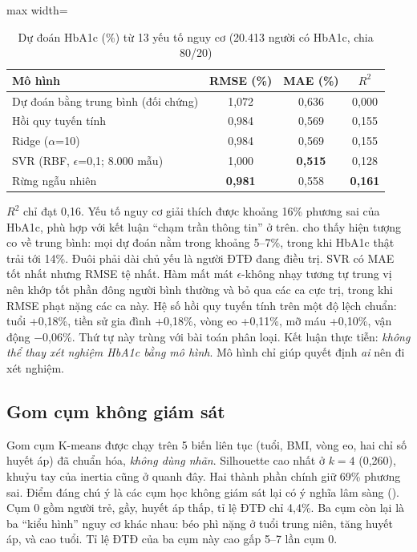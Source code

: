 \begin{table}[H]
\centering
\caption{Dự đoán HbA1c (\%) từ 13 yếu tố nguy cơ (20.413 người có HbA1c, chia 80/20)}
\label{tab:ch2-reg}
\small
\begin{adjustbox}{max width=\linewidth}
\begin{tabular}{@{}lccc@{}}
\toprule
\textbf{Mô hình} & \textbf{RMSE (\%)} & \textbf{MAE (\%)} & \textbf{$R^2$} \\
\midrule
Dự đoán bằng trung bình (đối chứng) & 1,072 & 0,636 & 0,000 \\
Hồi quy tuyến tính & 0,984 & 0,569 & 0,155 \\
Ridge ($\alpha$=10) & 0,984 & 0,569 & 0,155 \\
SVR (RBF, $\epsilon$=0,1; 8.000 mẫu) & 1,000 & \textbf{0,515} & 0,128 \\
Rừng ngẫu nhiên & \textbf{0,981} & 0,558 & \textbf{0,161} \\
\bottomrule
\end{tabular}
\end{adjustbox}
\end{table}


$R^2$ chỉ đạt 0,16. Yếu tố nguy cơ giải thích được khoảng 16\% phương sai của HbA1c, phù hợp với kết luận ``chạm trần thông tin'' ở trên.  cho thấy hiện tượng co về trung bình: mọi dự đoán nằm trong khoảng 5–7\%, trong khi HbA1c thật trải tới 14\%. Đuôi phải dài chủ yếu là người ĐTĐ đang điều trị. SVR có MAE tốt nhất nhưng RMSE tệ nhất. Hàm mất mát $\epsilon$-không nhạy tương tự trung vị nên khớp tốt phần đông người bình thường và bỏ qua các ca cực trị, trong khi RMSE phạt nặng các ca này. Hệ số hồi quy tuyến tính trên một độ lệch chuẩn: tuổi +0,18\%, tiền sử gia đình +0,18\%, vòng eo +0,11\%, mỡ máu +0,10\%, vận động −0,06\%. Thứ tự này trùng với bài toán phân loại. Kết luận thực tiễn: \emph{không thể thay xét nghiệm HbA1c bằng mô hình}. Mô hình chỉ giúp quyết định \emph{ai} nên đi xét nghiệm.

\subsection{Gom cụm không giám sát}


Gom cụm K-means được chạy trên 5 biến liên tục (tuổi, BMI, vòng eo, hai chỉ số huyết áp) đã chuẩn hóa, \emph{không dùng nhãn}. Silhouette cao nhất ở $k=4$ (0,260), khuỷu tay của inertia cũng ở quanh đây. Hai thành phần chính giữ 69\% phương sai. Điểm đáng chú ý là các cụm học không giám sát lại có ý nghĩa lâm sàng (). Cụm 0 gồm người trẻ, gầy, huyết áp thấp, tỉ lệ ĐTĐ chỉ 4,4\%. Ba cụm còn lại là ba ``kiểu hình'' nguy cơ khác nhau: béo phì nặng ở tuổi trung niên, tăng huyết áp, và cao tuổi. Tỉ lệ ĐTĐ của ba cụm này cao gấp 5–7 lần cụm 0.

